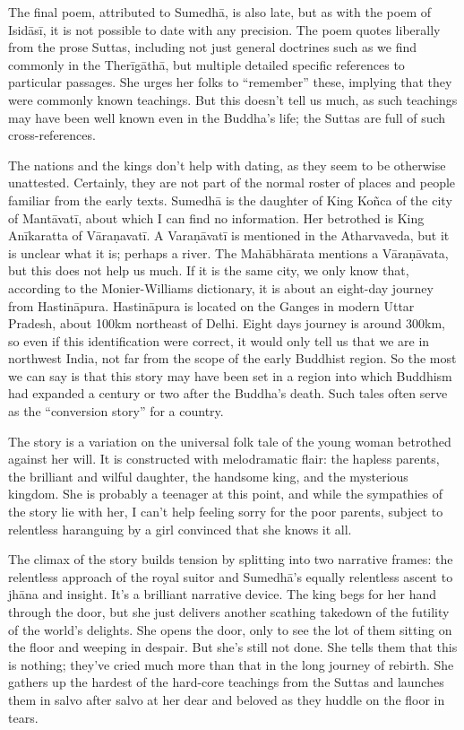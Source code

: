 \documentclass[12pt,openany]{book}%
\begin{document}
The final poem, attributed to \textsanskrit{Sumedhā}, is also late, but as with the poem of \textsanskrit{Isidāsī}, it is not possible to date with any precision. The poem quotes liberally from the prose Suttas, including not just general doctrines such as we find commonly in the \textsanskrit{Therīgāthā}, but multiple detailed specific references to particular passages. She urges her folks to “remember” these, implying that they were commonly known teachings. But this doesn’t tell us much, as such teachings may have been well known even in the Buddha’s life; the Suttas are full of such cross-references.

The nations and the kings don’t help with dating, as they seem to be otherwise unattested. Certainly, they are not part of the normal roster of places and people familiar from the early texts. \textsanskrit{Sumedhā} is the daughter of King \textsanskrit{Koñca} of the city of \textsanskrit{Mantāvatī}, about which I can find no information. Her betrothed is King \textsanskrit{Anīkaratta} of \textsanskrit{Vāraṇavatī}. A \textsanskrit{Varaṇāvatī} is mentioned in the Atharvaveda, but it is unclear what it is; perhaps a river. The \textsanskrit{Mahābhārata} mentions a \textsanskrit{Vāraṇāvata}, but this does not help us much. If it is the same city, we only know that, according to the Monier-Williams dictionary, it is about an eight-day journey from \textsanskrit{Hastināpura}. \textsanskrit{Hastināpura} is located on the Ganges in modern Uttar Pradesh, about 100km northeast of Delhi. Eight days journey is around 300km, so even if this identification were correct, it would only tell us that we are in northwest India, not far from the scope of the early Buddhist region. So the most we can say is that this story may have been set in a region into which Buddhism had expanded a century or two after the Buddha’s death. Such tales often serve as the “conversion story” for a country.

The story is a variation on the universal folk tale of the young woman betrothed against her will. It is constructed with melodramatic flair: the hapless parents, the brilliant and wilful daughter, the handsome king, and the mysterious kingdom. She is probably a teenager at this point, and while the sympathies of the story lie with her, I can’t help feeling sorry for the poor parents, subject to relentless haranguing by a girl convinced that she knows it all.

The climax of the story builds tension by splitting into two narrative frames: the relentless approach of the royal suitor and \textsanskrit{Sumedhā}’s equally relentless ascent to \textsanskrit{jhāna} and insight. It’s a brilliant narrative device. The king begs for her hand through the door, but she just delivers another scathing takedown of the futility of the world’s delights. She opens the door, only to see the lot of them sitting on the floor and weeping in despair. But she’s still not done. She tells them that this is nothing; they’ve cried much more than that in the long journey of rebirth. She gathers up the hardest of the hard-core teachings from the Suttas and launches them in salvo after salvo at her dear and beloved as they huddle on the floor in tears.
\end{document}

